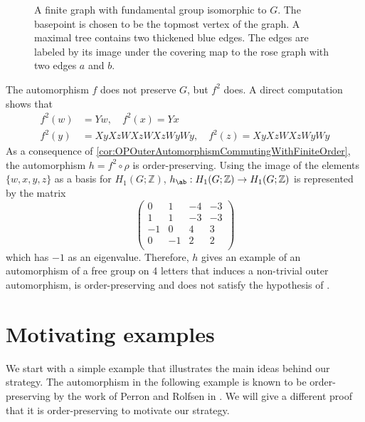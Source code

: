 \documentclass{amsart}
\begin{document}
\begin{example}
\begin{center}
\begin{figure}[h!]
        \caption{A finite graph with fundamental group isomorphic to $G$. The basepoint is chosen to be the topmost vertex of the graph. A maximal tree contains two thickened blue edges. The edges are labeled by its image under the covering map to the rose graph with two edges $a$ and $b$.}
        \label{fig:CoverWithFundamentalGroupG}
    \end{figure}    
    \end{center}
    \noindent
    
    
    \noindent
    The automorphism $f$ does not preserve $G$, but $f^2$ does. A direct computation shows that
    \begin{align*}
    f^2(w) &= Yw, \quad f^2(x) = Yx \\ 
    f^2(y) &= XyXzWXzWXzWyWy, \quad f^2(z) = XyXzWXzWyWy 
    \end{align*}
    As a consequence of \cref{cor:OPOuterAutomorphismCommutingWithFiniteOrder}, the automorphism $h = f^2\circ \rho$ is order-preserving. Using the image of the elements $\{w,x,y,z\}$ as a basis for $H_1(G;
    \mathbb{Z})$, $h_{\ab}:H_1(G;
    \mathbb{Z}) \to H_1(G;
    \mathbb{Z})$ is represented by the matrix
    \[
    \begin{pmatrix}
        0 & 1 & -4 & -3 \\
        1 & 1 & -3 & -3 \\
        -1 & 0 & 4 & 3 \\
        0 & -1 & 2 & 2 \\
    \end{pmatrix}
    \]
    which has $-1$ as an eigenvalue. Therefore, $h$ gives an example of an automorphism of a free group on 4 letters that induces a non-trivial outer automorphism, is order-preserving and does not satisfy the hypothesis of \cite[Theorem 2.6]{PerronRolfsen03}.
\end{example}
    


\section{Motivating examples}
\label{sec:MotivatingExamples}
We start with a simple example that illustrates the main ideas behind our strategy. The automorphism in the following example is known to be order-preserving by the work of Perron and Rolfsen in \cite{PerronRolfsen03}. We will give a different proof that it is order-preserving to motivate our strategy. 
\end{document}
